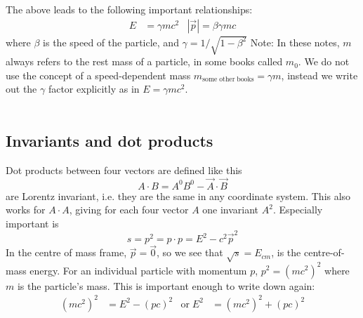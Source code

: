 The above leads to the following important relationships:
\begin{align}
\label{eq:EandP_fromBetaGammaM}
E &= \gamma m c^2 & \left|\vec{p}\right| = \beta \gamma m c
\end{align}
where $\beta$ is the speed of the particle, and $\gamma = 1/\sqrt{1-\beta^2}$
Note: In these notes, $m$ always refers to the rest mass of a particle, in some books called $m_0$. We do not use the concept of a speed-dependent mass $m_{\mathrm{some\;other\;books}}=\gamma m$, instead we write out the $\gamma$ factor explicitly as in $E=\gamma mc^2$.
\\
\\
\subsection{Invariants and dot products}
Dot products between four vectors are defined like this
\begin{equation}
A \cdot B = A^0 B^0 - \vec{A} \cdot \vec{B}
\end{equation}
are Lorentz invariant, i.e. they are the same in any coordinate system. This also works for $A \cdot A$, giving for each four vector $A$ one invariant $A^2$.
Especially important is
\begin{equation}
s = p^2 = p \cdot p = E^2 - c^2 \vec{p}^2
\end{equation}
In the centre of mass frame, $\vec{p}=\vec{0}$, so we see that $\sqrt{s}=E_{cm}$, is the centre-of-mass energy. For an individual particle with momentum $p$, $p^2=(mc^2)^2$ where $m$ is the particle's mass. This is important enough to write down again:
\begin{align}
(mc^2)^2 &= E^2 - (pc)^2 &\mathrm{or}\; E^2 &= (mc^2)^2 + (pc)^2
\end{align}

